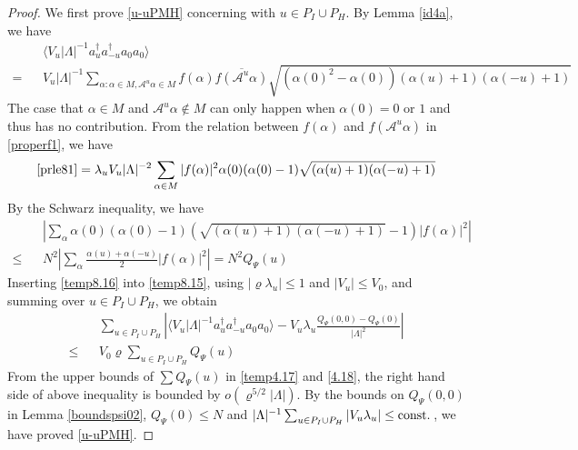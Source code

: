\documentclass[11pt]{article}
\numberwithin{equation}{section}
\newcommand{\beq}{\begin{equation}}
\newcommand{\eeq}{\end{equation}}
\newcommand{\beqa}{\begin{eqnarray}}
\newcommand{\eeqa}{\end{eqnarray}}
\newcommand\const{{\rm const.\, }}
\newcommand\al{{\alpha}}
\renewcommand\rho\varrho
\theoremstyle{definition}
\begin{document}
\begin{proof}
We first prove \eqref{u-uPMH} concerning with $u\in P_I\cup P_H$. By Lemma \ref{id4a}, we have
\beqa\label{prle81}
&&\langle V_u|\Lambda|^{-1}a^\dagger_ua^\dagger_{-u}a_0a_0\rangle\\\nonumber
=&&V_u|\Lambda|^{-1}\!\!\!\!\!\!\sum_{\al:\al\in M,  \mathcal A^u \al \in M }\!\!\!f(\al)\overline{f( \mathcal A^u \al )}\sqrt{(\al(0)^2-\al(0))(\al(u)+1)(\al(-u)+1)}
\eeqa
The case that $\al\in M$ and $ \mathcal A^u \al \notin M$ can only happen when $\al(0)=0$ or $1$
and thus has no contribution. 
{F}rom the relation between $f(\al)$ and $f( \mathcal A^u \al )$ in \eqref{properf1},  we have
\beq\label{temp8.15}
\eqref{prle81}=\lambda_uV_u|\Lambda|^{-2}\sum_{\al\in M }|f(\al)|^2\al(0)(\al(0)-1)\sqrt{(\al(u)+1)(\al(-u)+1)}
\eeq
By the Schwarz inequality, we have  
\beqa\label{temp8.16}
&&\left|\sum_{\al}\al(0)(\al(0)-1)\left(\sqrt{(\al(u)+1)(\al(-u)+1)}-1\right)|f(\al)|^2\right|\nonumber\\
\leq&&N^2\left|\sum_{\al}\frac{\al(u)+\al(-u)}2|f(\al)|^2\right|=N^2 Q_\Psi(u)
\eeqa
Inserting \eqref{temp8.16} into \eqref{temp8.15},  using $|\rho\lambda_u|\leq 1$ and $|V_u|\leq V_0$, and  summing  over $u\in P_I\cup P_H$,  we obtain
\beqa
&&\sum_{u\in P_I\cup P_H}\left|\langle V_u|\Lambda|^{-1}a^\dagger_ua^\dagger_{-u}a_0a_0\rangle-V_u\lambda_u\frac{Q_\Psi(0,0)-Q_\Psi(0)}{|\Lambda|^{2}}\right|\\\nonumber
\leq&&V_0 \rho\sum_{u\in P_I\cup P_H}Q_\Psi(u)
\eeqa
{F}rom  the upper bounds of $\sum Q_\Psi(u)$ in \eqref{temp4.17} and \eqref{4.18},  the right hand side  of above inequality is
bounded by $o(\rho^{5/2}|\Lambda|)$.  By  the bounds on $Q_\Psi(0,0)$ in  Lemma \ref{boundspsi02}, $Q_\Psi(0)\leq N$ and $|\Lambda|^{-1}\sum_{u\in P_I\cup P_H}|V_u\lambda_u|\leq\const$, we have proved  \eqref{u-uPMH}.




\end{proof}
\end{document}
